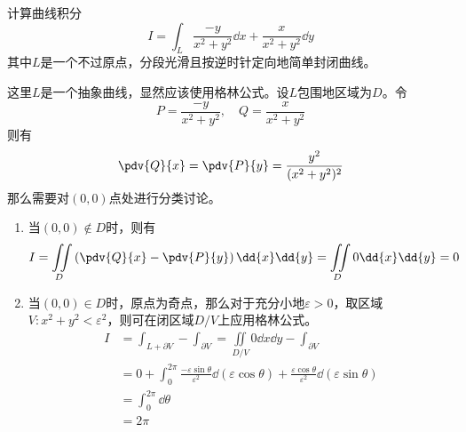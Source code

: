 \begin{example}
    计算曲线积分
    \[ I = \int_L\frac{-y}{x^2+y^2}\dd{x}+\frac{x}{x^2+y^2}\dd{y} \]
    其中$L$是一个不过原点，分段光滑且按逆时针定向地简单封闭曲线。
\end{example}
\begin{solution}
    这里$L$是一个抽象曲线，显然应该使用格林公式。设$L$包围地区域为$D$。令
    \[ P = \frac{-y}{x^2+y^2},\quad Q = \frac{x}{x^2+y^2} \]
    则有
    \[ \pdv{Q}{x} = \pdv{P}{y} = \frac{y^2}{(x^2+y^2)^2} \]
    那么需要对$(0,0)$点处进行分类讨论。
    \begin{enumerate}[(1)]
        \item 当$(0,0)\notin D$时，则有
              \[ I = \iint\limits_D \left(\pdv{Q}{x}-\pdv{P}{y}\right) \dd{x}\dd{y} = \iint\limits_D 0 \dd{x}\dd{y} = 0 \]
        \item 当$(0,0)\in D$时，原点为奇点，那么对于充分小地$\varepsilon > 0$，取区域$V: x^2+y^2 < \varepsilon^2$，则可在闭区域$D/V$上应用格林公式。
              \begin{align*}
                  I & = \int_{L+\partial V} - \int_{\partial V} = \iint\limits_{D/V} 0\dd{x}\dd{y} - \int_{\partial V}                                                                    \\
                    & = 0 + \int_0^{2\pi} \frac{-\varepsilon\sin\theta}{\varepsilon^2} \dd(\varepsilon\cos\theta) + \frac{\varepsilon\cos\theta}{\varepsilon^2}\dd(\varepsilon\sin\theta) \\
                    & = \int_0^{2\pi} \dd{\theta}                                                                                                                                         \\
                    & = 2\pi
              \end{align*}
    \end{enumerate}
\end{solution}

